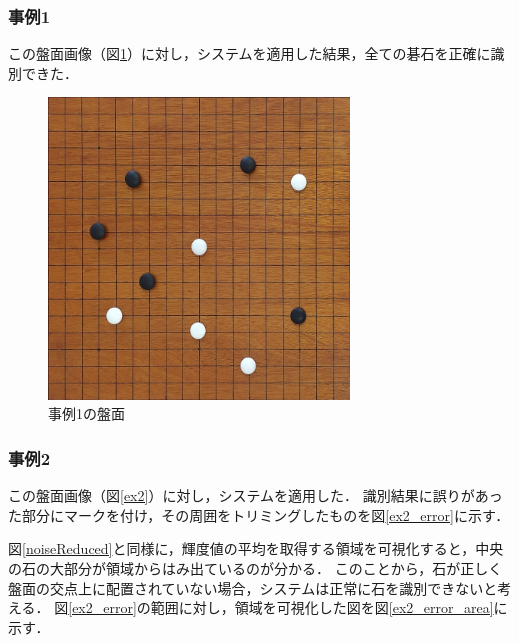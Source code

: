 \documentclass[openright]{nitocs}
\numberwithin{equation}{section}
\begin{document}
            \subsubsection{事例1}
                この盤面画像（図\ref{ex1}）に対し，システムを適用した結果，全ての碁石を正確に識別できた．
                \begin{figure}[tb] %
                    \begin{center}
                    \includegraphics[clip,width=80mm]{DSC_0041/boardImg.jpg} 
                    \caption{事例1の盤面}
                    \label{ex1}
                    \end{center}
                \end{figure}

            \subsubsection{事例2} %
                この盤面画像（図\ref{ex2}）に対し，システムを適用した．
                識別結果に誤りがあった部分にマークを付け，その周囲をトリミングしたものを図\ref{ex2_error}に示す．

                図\ref{noiseReduced}と同様に，輝度値の平均を取得する領域を可視化すると，中央の石の大部分が領域からはみ出ているのが分かる．
                このことから，石が正しく盤面の交点上に配置されていない場合，システムは正常に石を識別できないと考える．
                図\ref{ex2_error}の範囲に対し，領域を可視化した図を図\ref{ex2_error_area}に示す．
                
\end{document}
